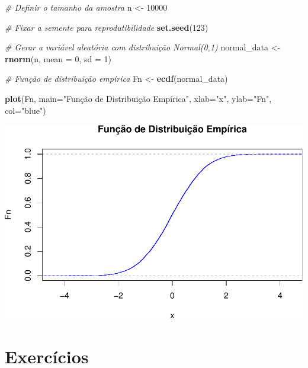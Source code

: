 \documentclass[
]{book}
\newenvironment{Shaded}{\begin{snugshade}}{\end{snugshade}}
\newcommand{\AttributeTok}[1]{\textcolor[rgb]{0.13,0.29,0.53}{#1}}
\newcommand{\CommentTok}[1]{\textcolor[rgb]{0.56,0.35,0.01}{\textit{#1}}}
\newcommand{\DecValTok}[1]{\textcolor[rgb]{0.00,0.00,0.81}{#1}}
\newcommand{\FunctionTok}[1]{\textcolor[rgb]{0.13,0.29,0.53}{\textbf{#1}}}
\newcommand{\NormalTok}[1]{#1}
\newcommand{\OtherTok}[1]{\textcolor[rgb]{0.56,0.35,0.01}{#1}}
\newcommand{\StringTok}[1]{\textcolor[rgb]{0.31,0.60,0.02}{#1}}
\begin{document}
\begin{Shaded}
\begin{Highlighting}[]
\CommentTok{\# Definir o tamanho da amostra}
\NormalTok{n }\OtherTok{\textless{}{-}} \DecValTok{10000}

\CommentTok{\# Fixar a semente para reprodutibilidade}
\FunctionTok{set.seed}\NormalTok{(}\DecValTok{123}\NormalTok{)}

\CommentTok{\# Gerar a variável aleatória com distribuição Normal(0,1)}
\NormalTok{normal\_data }\OtherTok{\textless{}{-}} \FunctionTok{rnorm}\NormalTok{(n, }\AttributeTok{mean =} \DecValTok{0}\NormalTok{, }\AttributeTok{sd =} \DecValTok{1}\NormalTok{)}

\CommentTok{\# Função de distribuição empírica}
\NormalTok{Fn }\OtherTok{\textless{}{-}} \FunctionTok{ecdf}\NormalTok{(normal\_data)}

\FunctionTok{plot}\NormalTok{(Fn, }\AttributeTok{main=}\StringTok{"Função de Distribuição Empírica"}\NormalTok{,}
     \AttributeTok{xlab=}\StringTok{"x"}\NormalTok{,}
     \AttributeTok{ylab=}\StringTok{"Fn"}\NormalTok{,}
     \AttributeTok{col=}\StringTok{"blue"}\NormalTok{)}
\end{Highlighting}
\end{Shaded}

\includegraphics{meuLivro2_files/figure-latex/unnamed-chunk-137-1.pdf}

\section{Exercícios}\label{exercuxedcios-11}
\end{document}

